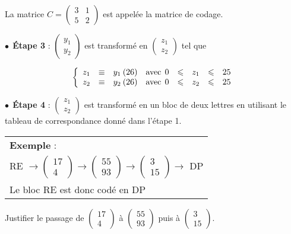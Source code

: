 \documentclass[10pt]{article}
\begin{document}
La matrice $C = \begin{pmatrix}3&1\\5&2\end{pmatrix}$ est appelée la matrice de codage.
 
$\bullet~~$\textbf{Étape 3} : $\begin{pmatrix}y_{1}\\y_{2}\end{pmatrix}$ est transformé en $\begin{pmatrix}z_{1}\\z_{2}\end{pmatrix}$ tel que
 
\[\left\{\begin{array}{l c l c l c l l}
z_{1}& \equiv& y_{1}\: (26)& \text{avec}\:\: 0 &\leqslant& z_{1}&\leqslant& 25\\
z_{2}& \equiv& y_{2}\: (26)& \text{avec}\:\: 0 &\leqslant& z_{2}&\leqslant& 25
\end{array}\right.\] 

$\bullet~~$\textbf{Étape 4} : $\begin{pmatrix}z_{1}\\z_{2}\end{pmatrix}$ est transformé en un bloc de deux lettres en utilisant le tableau de correspondance donné dans l'étape 1.

\begin{center}
\begin{tabular}{|l} 
\textbf{Exemple} : \\
RE $\to \begin{pmatrix}17\\4\end{pmatrix}\to \begin{pmatrix}55\\93\end{pmatrix} \to \begin{pmatrix}3\\15\end{pmatrix}\to $ DP\\
Le bloc RE est donc codé en DP\\
\end{tabular}
\end{center}
 
Justifier le passage de $\begin{pmatrix}17\\4\end{pmatrix}$ à $\begin{pmatrix}55\\93\end{pmatrix}$ puis à  $\begin{pmatrix}3\\15\end{pmatrix}$.
\end{document}
